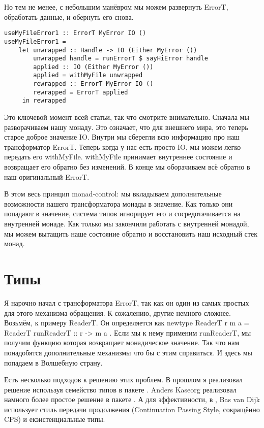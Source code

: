 Но тем не менее, с небольшим манёвром мы можем развернуть ErrorT, обработать данные, и обернуть его снова.

\begin{lstlisting}
useMyFileError1 :: ErrorT MyError IO ()
useMyFileError1 =
    let unwrapped :: Handle -> IO (Either MyError ())
        unwrapped handle = runErrorT $ sayHiError handle
        applied :: IO (Either MyError ())
        applied = withMyFile unwrapped
        rewrapped :: ErrorT MyError IO ()
        rewrapped = ErrorT applied
     in rewrapped
\end{lstlisting}

Это ключевой момент всей статьи, так что смотрите внимательно. Сначала мы разворачиваем нашу монаду. Это означает, что для внешнего мира, это теперь старое доброе значение IO. Внутри мы сберегли всю информацию про наш трансформатор ErrorT. Теперь когда у нас есть просто IO, мы можем легко передать его withMyFile. withMyFile принимает внутреннее состояние и возвращает его обратно без изменений. В конце мы оборачиваем всё обратно в наш оригинальный ErrorT.

В этом весь принцип monad-control: мы вкладываем дополнительные возможности нашего трансформатора монады в значение. Как только они попадают в значение, система типов игнорирует его и сосредотачивается на внутренней монаде. Как только мы закончили работать с внутренней монадой, мы можем вытащить наше состояние обратно и восстановить наш исходный стек монад.

\section{Типы}

Я нарочно начал с трансформатора ErrorT, так как он один из самых простых для этого механизма обращения. К сожалению, другие немного сложнее. Возьмём, к примеру ReaderT. Он определяется как newtype ReaderT r m a = ReaderT { runReaderT :: r -> m a }. Если мы к нему применим runReaderT, мы получим функцию которая возвращает монадическое значение. Так что нам понадобятся дополнительные механизмы что бы с этим справиться. И здесь мы попадаем в Волшебную страну.

Есть несколько подходов к решению этих проблем. В прошлом я реализовал решение используя семейство типов в пакете . Anders Kaseorg реализовал намного более простое решение в пакете . А для эффективности, в , Bas van Dijk использует стиль передачи продолжения (Continuation Passing Style, сокращённо CPS) и екзистенциальные типы.

